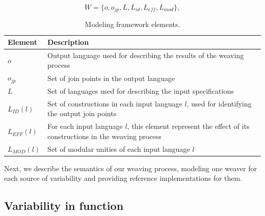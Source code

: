 \documentclass{sig-alternate}
\begin{document}

\begin{equation}
W = \{o, o_{jp}, L, L_{id}, L_{eff}, L_{mod}\},
\label{eq:tuple}
\end{equation}

\begin{table}[h]
\begin{center}
\caption{Modeling framework elements.} \label{tab:tup-01}
\begin{tabular}{|p{0.6in}|p{2.4in}|}
  \hline
  {\bf Element} & {\bf Description} \\
   \hline
  $o$              & Output language used for describing the results of the weaving process \\ \hline
  $o_{jp}$       & Set of join points in the output language \\ \hline
  $L$              & Set of languages used for describing the input specifications \\ \hline
  $L_{ID}(l)$      & Set of constructions in each input language $l$, used for identifying the output join points \\ \hline
  $L_{EFF}(l)$   & For each input language $l$, this element represent the effect of its constructions in the weaving process \\ \hline
  $L_{MOD}(l)$  & Set of modular unities of each input language $l$\\
  \hline
\end{tabular}
\end{center}
\end{table}

Next, we describe the semantics of
our weaving process, modeling one weaver for each source of variability and
providing reference implementations for them.

\subsection{Variability in function}\label{sub:pd-weaver}
\end{document}
